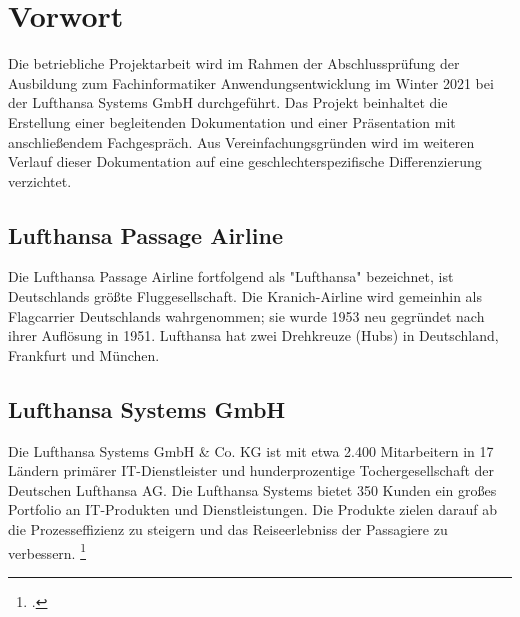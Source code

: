 \section{Vorwort}

	Die betriebliche Projektarbeit wird im Rahmen der Abschlussprüfung der Ausbildung zum
	Fachinformatiker Anwendungsentwicklung im Winter 2021 bei der Lufthansa Systems GmbH durchgeführt.
	Das Projekt beinhaltet die Erstellung einer begleitenden
	Dokumentation und einer Präsentation mit anschließendem Fachgespräch. Aus Vereinfachungsgründen wird im weiteren Verlauf dieser Dokumentation auf eine geschlechterspezifische
	Differenzierung verzichtet.


	\subsection{Lufthansa Passage Airline}
	Die Lufthansa Passage Airline fortfolgend als "Lufthansa" bezeichnet, ist Deutschlands größte Fluggesellschaft. Die Kranich-Airline wird gemeinhin als Flagcarrier Deutschlands wahrgenommen; sie wurde 1953 neu gegründet nach ihrer Auflösung in 1951. Lufthansa hat zwei Drehkreuze (Hubs) in Deutschland, Frankfurt und München.

	\subsection{Lufthansa Systems GmbH}
	Die Lufthansa Systems GmbH \& Co. KG ist mit etwa 2.400 Mitarbeitern in 17 Ländern primärer IT-Dienstleister und hunderprozentige Tochergesellschaft der Deutschen Lufthansa AG.
	Die Lufthansa Systems bietet 350 Kunden ein großes Portfolio an IT-Produkten und Dienstleistungen. Die Produkte zielen darauf ab die Prozesseffizienz zu steigern und das Reiseerlebniss der Passagiere zu verbessern.
	\footcite{1}

